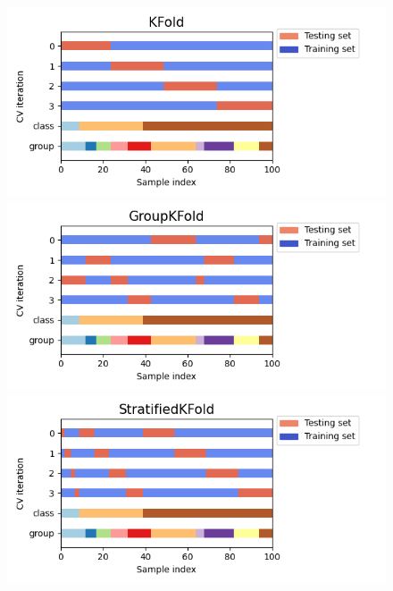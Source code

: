 \documentclass[
  letterpaper,
]{krantz}
\begin{document}
\begin{figure}

\begin{minipage}{0.50\linewidth}

\includegraphics{img/sklearn_k_fold_images/k_fold.png}

\end{minipage}%
%
\begin{minipage}{0.50\linewidth}

\includegraphics{img/sklearn_k_fold_images/grouped_k_fold.png}

\end{minipage}%
\newline
\begin{minipage}{0.50\linewidth}

\includegraphics{img/sklearn_k_fold_images/stratified_k_fold.png}


\end{minipage}
\end{figure}
\end{document}
